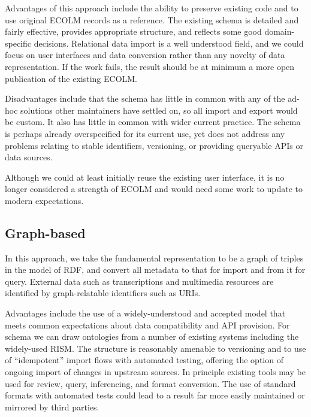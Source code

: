 \documentclass[sigconf]{acmart}
\begin{document}
\begin{sloppypar}
  Advantages of this approach include the ability to preserve existing
  code and to use original ECOLM records as a reference. The existing
  schema is detailed and fairly effective, provides appropriate
  structure, and reflects some good domain-specific
  decisions. Relational data import is a well understood field, and we
  could focus on user interfaces and data conversion rather than any
  novelty of data representation. If the work fails, the result should
  be at minimum a more open publication of the existing ECOLM.

  Disadvantages include that the schema has little in common with any
  of the ad-hoc solutions other maintainers have settled on, so all
  import and export would be custom. It also has little in common with
  wider current practice. The schema is perhaps already overspecified
  for its current use, yet does not address any problems relating to
  stable identifiers, versioning, or providing queryable APIs or data
  sources.

  Although we could at least initially reuse the existing user
  interface, it is no longer considered a strength of ECOLM and would
  need some work to update to modern expectations.

  \subsection{Graph-based}

  In this approach, we take the fundamental representation to be a
  graph of triples in the model of RDF, and convert all metadata to
  that for import and from it for query. External data such as
  transcriptions and multimedia resources are identified by
  graph-relatable identifiers such as URIs.

  Advantages include the use of a widely-understood and accepted model
  that meets common expectations about data compatibility and API
  provision. For schema we can draw ontologies from a number of
  existing systems including the widely-used RISM. The structure is
  reasonably amenable to versioning and to use of ``idempotent''
  import flows with automated testing, offering the option of ongoing
  import of changes in upstream sources. In principle existing tools
  may be used for review, query, inferencing, and format
  conversion. The use of standard formats with automated tests could
  lead to a result far more easily maintained or mirrored by third
  parties.


\end{sloppypar}
\end{document}
